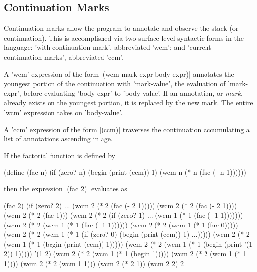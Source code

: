 \documentclass{llncs}
\begin{document}
\subsection{Continuation Marks}

Continuation marks allow the program to annotate and observe the stack (or continuation). This is accomplished via two surface-level syntactic forms in the language: \scheme'with-continuation-mark', abbreviated \scheme'wcm'; and \scheme'current-continuation-marks', abbreviated \scheme'ccm'.

A \scheme'wcm' expression of the form \scheme|(wcm mark-expr body-expr)| annotates the youngest portion of the continuation with \scheme'mark-value', the evaluation of \scheme'mark-expr', before evaluating \scheme'body-expr' to \scheme'body-value'. If an annotation, or \emph{mark}, already exists on the youngest portion, it is replaced by the new mark. The entire \scheme'wcm' expression takes on \scheme'body-value'.

A \scheme'ccm' expression of the form \scheme|(ccm)| traverses the continuation accumulating a list of annotations ascending in age.

If the factorial function is defined by
\begin{schemedisplay}
(define (fac n)
  (if (zero? n)
      (begin
        (print (ccm))
        1)
      (wcm n (* n (fac (- n 1))))))
\end{schemedisplay}
then the expression \scheme|(fac 2)| evaluates as
\begin{schemedisplay}
(fac 2)
(if (zero? 2) ... (wcm 2 (* 2 (fac (- 2 1)))))
(wcm 2 (* 2 (fac (- 2 1))))
(wcm 2 (* 2 (fac 1)))
(wcm 2 (* 2 (if (zero? 1) ... (wcm 1 (* 1 (fac (- 1 1)))))))
(wcm 2 (* 2 (wcm 1 (* 1 (fac (- 1 1))))))
(wcm 2 (* 2 (wcm 1 (* 1 (fac 0)))))
(wcm 2 (* 2 (wcm 1 (* 1 (if (zero? 0) (begin (print (ccm)) 1) ...)))))
(wcm 2 (* 2 (wcm 1 (* 1 (begin (print (ccm)) 1)))))
(wcm 2 (* 2 (wcm 1 (* 1 (begin (print '(1 2)) 1)))))
'(1 2)
(wcm 2 (* 2 (wcm 1 (* 1 (begin 1)))))
(wcm 2 (* 2 (wcm 1 (* 1 1))))
(wcm 2 (* 2 (wcm 1 1)))
(wcm 2 (* 2 1))
(wcm 2 2)
2
\end{schemedisplay}
\end{document}
